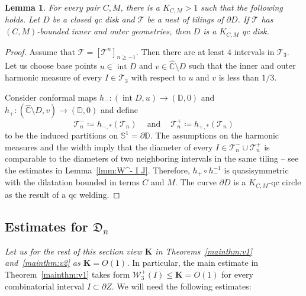 \documentclass{amsart}
\renewcommand{\sp}{{\ \ }}
\newcommand{\1}{{\mathbb 1 }}
\newcommand{\Width}{{\mathcal W}}
\newcommand\TT{\mathcal{T}}
\newcommand\intr{\operatorname{int}}
\newcommand{\bK}{{\mathbf K}}
\newcommand{\wC}{\widehat{\mathbb{C}}}
\newcommand{\Circle}{\mathbb{S}^1}
\newcommand{\Disk}{\mathbb{D}}
\newcommand{\Dbb}{{\mathfrak{D}}}
\newtheorem{lem}[thm]{Lemma}
\theoremstyle{remark}
\numberwithin{equation}{section}
\theoremstyle{definition}
\begin{document}
\begin{lem}
\label{lmm:qc tiling condit}
For every pair $C,M$, there is a $K_{C,M}>1$ such that the following holds. Let $D$ be a closed qc disk and $\TT$ be a nest of tilings of $\partial D$. If $\TT$ has $(C,M)$-bounded inner and outer geometries, then $D$ is a $K_{C,M}$ qc disk.
\end{lem}
\begin{proof}
Assume that $\TT=[\TT^n]_{n\ge -1}$. Then there are at least $4$ intervals in $\TT_3$. Let us choose base points $u\in \intr D$ and $v\in \wC\setminus D$ such that the inner and outer harmonic measure of every $I\in \TT_3$ with respect to $u$ and $v$ is less than $1/3$.
 
Consider conformal maps $h_-\colon (\intr D,u)\to (\Disk, 0)$ and $h_+\colon (\wC\setminus D,v)\to (\Disk, 0)$ and define \[\TT^-_n\coloneqq h_{-,*}(\TT_n)\sp\sp \text{ and }\sp\sp \TT^+_n \coloneqq  h_{+, *}(\TT_n)\]
to be the induced partitions on $\Circle=\partial \Disk$. The assumptions on the harmonic measures and the width imply that the diameter of every $I\in \TT_n^-\cup \TT_n^+$ is comparable to the diameters of two neighboring intervals in the same tiling -- see the estimates in Lemma~\ref{lmm:W^- I J}. Therefore, $h_+\circ h_-^{-1}$ is quasisymmetric with the dilatation bounded in terms $C$ and $M$. The curve $\partial D$ is a $K_{C,M}$-qc circle as the result of a qc welding.
\end{proof}


\subsection{Estimates for $\Dbb_n$} \emph{Let us for the rest of this section view $\bK$ in Theorems~\ref{mainthm:v1} and~\ref{mainthm:v2} as $\bK=O(1)$.} In particular, the main estimate in Theorem~\ref{mainthm:v1}  takes form $\Width^+_3(I)\le \bK=O(1)$ for every combinatorial interval $I\subset \partial Z$. We will need the following estimates:
\end{document}
